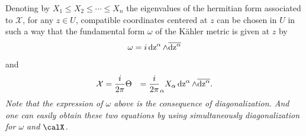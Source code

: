 \documentclass[lang=en,12pt]{beautybook}
\begin{document}
Denoting by $X_1 \leqslant X_2 \leqslant \cdots \leqslant X_n$ the eigenvalues
of the hermitian form associated to $\mathcal{X}$, for any $z \in U$,
compatible coordinates centered at $z$ can be chosen in $U$ in such a way that
the fundamental form $\omega$ of the K\"ahler metric is given at $z$ by
\[ \omega = i \relax \operatorname{dz}^{\alpha} \wedge \overline{\operatorname{dz}^{\alpha}} \]
and
\begin{eqnarray*}
  \mathcal{X} & = \dfrac{i}{2 \pi} \Theta & = \frac{i}{2 \pi} \relax_{\alpha}
  X_{\alpha} \operatorname{dz}^{\alpha} \wedge \overline{\operatorname{dz}^{\alpha}} .
\end{eqnarray*}
\textit{Note that the expression of $\omega$ above is the consequence of diagonalization. And one can easily obtain these two equations by using simultaneously  diagonalization for $\omega$ and $\calX$.}
\end{document}
